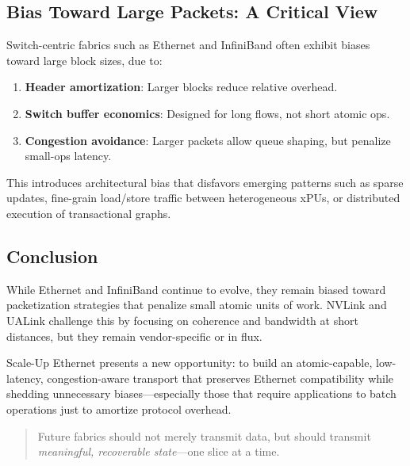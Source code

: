 \documentclass[../../../OAE-SPEC-MAIN.tex]{subfiles}
\begin{document}
\subsection{Bias Toward Large Packets: A Critical View}

Switch-centric fabrics such as Ethernet and InfiniBand often exhibit biases toward large block sizes, due to:

\begin{enumerate}
  \item \textbf{Header amortization}: Larger blocks reduce relative overhead.
  \item \textbf{Switch buffer economics}: Designed for long flows, not short atomic ops.
  \item \textbf{Congestion avoidance}: Larger packets allow queue shaping, but penalize small-ops latency.
\end{enumerate}

This introduces architectural bias that disfavors emerging patterns such as sparse updates, fine-grain load/store traffic between heterogeneous xPUs, or distributed execution of transactional graphs.

\subsection{Conclusion}

While Ethernet and InfiniBand continue to evolve, they remain biased toward packetization strategies that penalize small atomic units of work. NVLink and UALink challenge this by focusing on coherence and bandwidth at short distances, but they remain vendor-specific or in flux.

Scale-Up Ethernet presents a new opportunity: to build an atomic-capable, low-latency, congestion-aware transport that preserves Ethernet compatibility while shedding unnecessary biases—especially those that require applications to batch operations just to amortize protocol overhead.


\begin{quote}
Future fabrics should not merely transmit data, but should transmit \emph{meaningful, recoverable state}—one slice at a time.
\end{quote}
\end{document}
